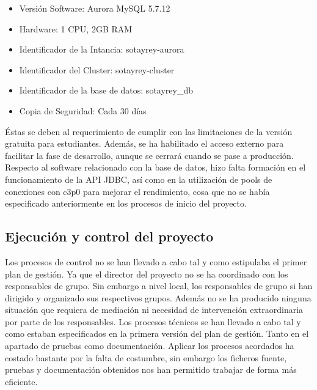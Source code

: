 \begin{itemize}
	\item Versión Software: Aurora MySQL 5.7.12
	\item Hardware: 1 CPU, 2GB RAM
	\item Identificador de la Intancia: sotayrey-aurora
	\item Identificador del Cluster: sotayrey-cluster
	\item Identificador de la base de datos: sotayrey\_db
	\item Copia de Seguridad: Cada 30 días
\end{itemize}

Éstas se deben al requerimiento de cumplir con las limitaciones de la versión gratuita para estudiantes. Además, se ha habilitado el acceso externo para facilitar la fase de desarrollo, aunque se cerrará cuando se pase a producción. Respecto al software relacionado con la base de datos, hizo falta formación en el funcionamiento de la API JDBC, así como en la utilización de pools de conexiones con c3p0 para mejorar el rendimiento, cosa que no se había especificado anteriormente en los procesos de inicio del proyecto.

\subsection{Ejecución y control del proyecto}
\label{Ejecucion y control del proyecto}
Los procesos de control no se han llevado a cabo tal y como estipulaba el primer plan de gestión. Ya que el director del proyecto no se ha coordinado con los responsables de grupo. Sin embargo a nivel local, los responsables de grupo si han dirigido y organizado sus respectivos grupos. Además no se ha producido ninguna situación que requiera de mediación ni necesidad de intervención extraordinaria por parte de los responsables. 
Los procesos técnicos se han llevado a cabo tal y como estaban especificados en la primera versión del plan de gestión. Tanto en el apartado de pruebas como documentación. Aplicar los procesos acordados ha costado bastante por la falta de costumbre, sin embargo los ficheros fuente, pruebas y documentación obtenidos nos han permitido trabajar de forma más eficiente.
